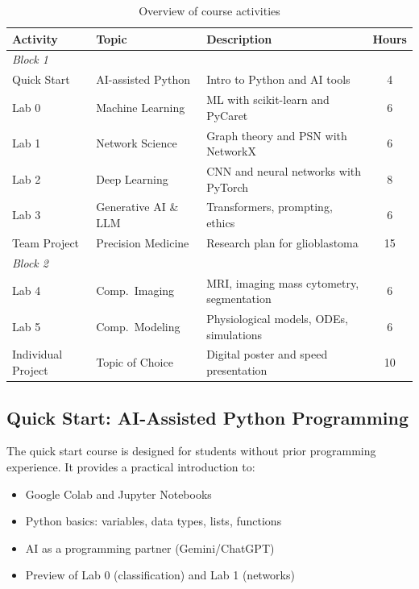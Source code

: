 \documentclass[11pt,a4paper]{article}
\begin{document}
\begin{table}[htbp]
\centering
\caption{Overview of course activities}
\label{tab:activities}
\begin{tabular}{@{}llp{5.5cm}c@{}}
\toprule
\textbf{Activity} & \textbf{Topic} & \textbf{Description} & \textbf{Hours} \\
\midrule
\multicolumn{4}{l}{\textit{Block 1}} \\
\midrule
Quick Start & AI-assisted Python & Intro to Python and AI tools & 4 \\
Lab 0 & Machine Learning & ML with scikit-learn and PyCaret & 6 \\
Lab 1 & Network Science & Graph theory and PSN with NetworkX & 6 \\
Lab 2 & Deep Learning & CNN and neural networks with PyTorch & 8 \\
Lab 3 & Generative AI \& LLM & Transformers, prompting, ethics & 6 \\
Team Project & Precision Medicine & Research plan for glioblastoma & 15 \\
\midrule
\multicolumn{4}{l}{\textit{Block 2}} \\
\midrule
Lab 4 & Comp.\ Imaging & MRI, imaging mass cytometry, segmentation & 6 \\
Lab 5 & Comp.\ Modeling & Physiological models, ODEs, simulations & 6 \\
Individual Project & Topic of Choice & Digital poster and speed presentation & 10 \\
\bottomrule
\end{tabular}
\end{table}

\subsection{Quick Start: AI-Assisted Python Programming}

The quick start course is designed for students without prior programming experience. It provides a practical introduction to:

\begin{itemize}[nosep]
    \item Google Colab and Jupyter Notebooks
    \item Python basics: variables, data types, lists, functions
    \item AI as a programming partner (Gemini/ChatGPT)
    \item Preview of Lab 0 (classification) and Lab 1 (networks)
\end{itemize}
\end{document}
